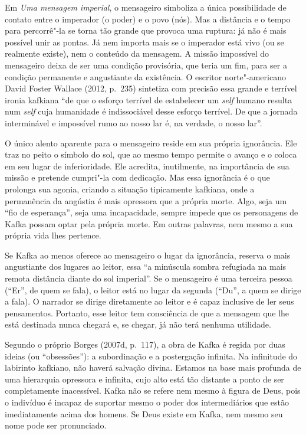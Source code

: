 Em \emph{Uma mensagem imperial}, o mensageiro simboliza a única
possibilidade de contato entre o imperador (o poder) e o povo (nós). Mas
a distância e o tempo para percorrê"-la se torna tão grande que provoca
uma ruptura: já não é mais possível unir as pontas. Já nem importa mais
se o imperador está vivo (ou se realmente existe), nem o conteúdo da
mensagem. A missão impossível do mensageiro deixa de ser uma condição
provisória, que teria um fim, para ser a condição permanente e
angustiante da existência. O escritor norte"-americano David Foster
Wallace (2012, p.~235) sintetiza com precisão essa grande e terrível
ironia kafkiana ``de que o esforço terrível de estabelecer um
\emph{self} humano resulta num \emph{self} cuja humanidade é
indissociável desse esforço terrível. De que a jornada interminável e
impossível rumo ao nosso lar é, na verdade, o nosso lar''.

O único alento aparente para o mensageiro reside em sua própria
ignorância. Ele traz no peito o símbolo do sol, que ao mesmo tempo
permite o avanço e o coloca em seu lugar de inferioridade. Ele acredita,
inutilmente, na importância de sua missão e pretende cumpri"-la com
dedicação. Mas essa ignorância é o que prolonga sua agonia, criando a
situação tipicamente kafkiana, onde a permanência da angústia é mais
opressora que a própria morte. Algo, seja um ``fio de esperança'', seja
uma incapacidade, sempre impede que os personagens de Kafka possam optar
pela própria morte. Em outras palavras, nem mesmo a sua própria vida
lhes pertence.

Se Kafka ao menos oferece ao mensageiro o lugar da ignorância, reserva o
mais angustiante dos lugares ao leitor, essa ``a minúscula sombra
refugiada na mais remota distância diante do sol imperial''. Se o
mensageiro é uma terceira pessoa (``Er'', de quem se fala), o leitor
está no lugar da segunda (``Du'', a quem se dirige a fala). O narrador
se dirige diretamente ao leitor e é capaz inclusive de ler seus
pensamentos. Portanto, esse leitor tem consciência de que a mensagem que
lhe está destinada nunca chegará e, se chegar, já não terá nenhuma
utilidade.

Segundo o próprio Borges (2007d, p.~117), a obra de Kafka é regida por
duas ideias (ou ``obsessões''): a subordinação e a postergação infinita.
Na infinitude do labirinto kafkiano, não haverá salvação divina. Estamos
na base mais profunda de uma hierarquia opressora e infinita, cujo alto
está tão distante a ponto de ser completamente inacessível. Kafka não se
refere nem mesmo à figura de Deus, pois o indivíduo é incapaz de
suportar mesmo o poder dos intermediários que estão imediatamente acima
dos homens. Se Deus existe em Kafka, nem mesmo seu nome pode ser
pronunciado.

